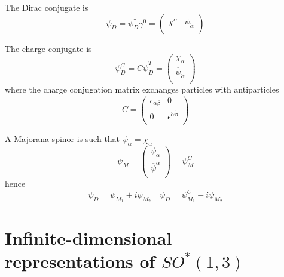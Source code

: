     The Dirac conjugate is 
    \begin{equation*}
        \overline \psi_D = \psi^\dagger_D \gamma^0 = \begin{pmatrix}
            \chi^\alpha & \overline \psi_{\dot \alpha} \\
        \end{pmatrix}
    \end{equation*}

    The charge conjugate is 
    \begin{equation*}
        \psi_D^{C} = C \overline \psi^T_D = \begin{pmatrix}
            \chi_\alpha \\
            \overline \psi_{\dot \alpha} \\
        \end{pmatrix}
    \end{equation*}
    where the charge conjugation matrix exchanges particles with antiparticles 
    \begin{equation*}
        C = \begin{pmatrix}
            \epsilon_{\alpha \beta} & 0 \\
            0 & \epsilon^{\dot \alpha \dot \beta} \\
        \end{pmatrix}
    \end{equation*}

    A Majorana spinor is such that $\psi_\alpha = \chi_\alpha$ 
    \begin{equation*}
        \psi_M = \begin{pmatrix}
            \psi_\alpha \\
            \overline \psi^{\dot \alpha} \\
        \end{pmatrix} = \psi^C_M
    \end{equation*}
    hence 
    \begin{equation*}
        \psi_D = \psi_{M_1} + i \psi_{M_2} \quad \psi_D = \psi^C_{M_1} - i \psi_{M_2}
    \end{equation*}

\section{Infinite-dimensional representations of $SO^*(1,3)$}


